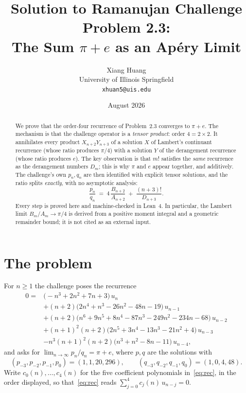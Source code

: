 \documentclass[11pt]{article}
\title{Solution to Ramanujan Challenge Problem 2.3:\\
The Sum $\pi + e$ as an Ap\'ery Limit}
\author{Xiang Huang\\{\small University of Illinois Springfield}\\{\small\texttt{xhuan5@uis.edu}}}
\date{August 2026}
\theoremstyle{remark}
\begin{document}
\maketitle

\begin{abstract}
We prove that the order-four recurrence of Problem~2.3 converges to $\pi+e$.
The mechanism is that the challenge operator is a \emph{tensor product}: order
$4 = 2\times 2$. It annihilates every product $X_{n+2}Y_{n+3}$ of a solution
$X$ of Lambert's continuant recurrence (whose ratio produces $\pi/4$) with a
solution $Y$ of the derangement recurrence (whose ratio produces $e$). The key
observation is that $m!$ satisfies the \emph{same} recurrence as the derangement
numbers $D_m$; this is why $\pi$ and $e$ appear together, and additively. The
challenge's own $p_n,q_n$ are then identified with explicit tensor solutions,
and the ratio splits \emph{exactly}, with no asymptotic analysis:
\[
\frac{p_n}{q_n} \;=\; 4\,\frac{B_{n+2}}{A_{n+2}} \;+\; \frac{(n+3)!}{D_{n+3}}.
\]
Every step is proved here and machine-checked in Lean~4. In particular, the
Lambert limit $B_m/A_m\to\pi/4$ is derived from a positive moment integral and
a geometric remainder bound; it is not cited as an external input.
\end{abstract}

\section{The problem}

For $n \ge 1$ the challenge poses the recurrence
\begin{equation}\label{eq:rec}
\begin{aligned}
0 = {}& \bigl(-n^3 + 2n^2 + 7n + 3\bigr)\,u_n \\
 &+ (n+2)\bigl(2n^4 + n^3 - 26n^2 - 48n - 19\bigr)\,u_{n-1} \\
 &+ (n+2)\bigl(n^6 + 9n^5 + 8n^4 - 87n^3 - 249n^2 - 234n - 68\bigr)\,u_{n-2} \\
 &+ (n+1)^2(n+2)\bigl(2n^5 + 3n^4 - 13n^3 - 21n^2 + 4\bigr)\,u_{n-3} \\
 &- n^3(n+1)^2(n+2)\bigl(n^3 + n^2 - 8n - 11\bigr)\,u_{n-4},
\end{aligned}
\end{equation}
and asks for $\lim_{n\to\infty} p_n/q_n = \pi+e$, where $p,q$ are the solutions
with
\begin{equation}\label{eq:init}
(p_{-3},p_{-2},p_{-1},p_0) = (1,1,20,296),
\qquad
(q_{-3},q_{-2},q_{-1},q_0) = (1,0,4,48).
\end{equation}
Write $c_0(n),\dots,c_4(n)$ for the five coefficient polynomials
in~\eqref{eq:rec}, in the order displayed, so that~\eqref{eq:rec} reads
$\sum_{j=0}^{4} c_j(n)\,u_{n-j}=0$.
\end{document}
